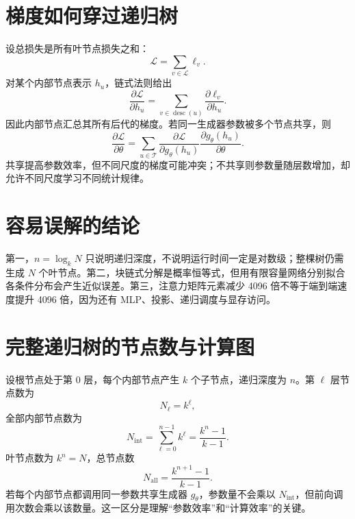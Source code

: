 \documentclass[UTF8,12pt,a4paper,fontset=none]{ctexart}
\numberwithin{equation}{section}
\newcommand{\Loss}{\mathcal{L}}
\begin{document}
\section{梯度如何穿过递归树}
设总损失是所有叶节点损失之和：
\begin{equation}
 \Loss=\sum_{v\in\mathcal{L}}\ell_v.
\end{equation}
对某个内部节点表示 $h_u$，链式法则给出
\begin{equation}
 \frac{\partial\Loss}{\partial h_u}
 =\sum_{v\in\operatorname{desc}(u)}
 \frac{\partial\ell_v}{\partial h_u}.
\end{equation}
因此内部节点汇总其所有后代的梯度。若同一生成器参数被多个节点共享，则
\begin{equation}
 \frac{\partial\Loss}{\partial\theta}
 =\sum_{u\in\mathcal{T}}
 \frac{\partial\Loss}{\partial g_\theta(h_u)}
 \frac{\partial g_\theta(h_u)}{\partial\theta}.
\end{equation}
共享提高参数效率，但不同尺度的梯度可能冲突；不共享则参数量随层数增加，却允许不同尺度学习不同统计规律。

\section{容易误解的结论}
\begin{criticalbox}[三点边界]
第一，$n=\log_kN$ 只说明递归深度，不说明运行时间一定是对数级；整棵树仍需生成 $N$ 个叶节点。第二，块链式分解是概率恒等式，但用有限容量网络分别拟合各条件分布会产生近似误差。第三，注意力矩阵元素减少 4096 倍不等于端到端速度提升 4096 倍，因为还有 MLP、投影、递归调度与显存访问。
\end{criticalbox}

\section{完整递归树的节点数与计算图}
设根节点处于第 $0$ 层，每个内部节点产生 $k$ 个子节点，递归深度为 $n$。第 $\ell$ 层节点数为
\begin{equation}
 N_\ell=k^\ell,
\end{equation}
全部内部节点数为
\begin{equation}
 N_{\mathrm{int}}=\sum_{\ell=0}^{n-1}k^\ell
 =\frac{k^n-1}{k-1}.
\end{equation}
叶节点数为 $k^n=N$，总节点数
\begin{equation}
 N_{\mathrm{all}}=\frac{k^{n+1}-1}{k-1}.
\end{equation}
若每个内部节点都调用同一参数共享生成器 $g_\theta$，参数量不会乘以 $N_{\mathrm{int}}$，但前向调用次数会乘以该数量。这一区分是理解“参数效率”和“计算效率”的关键。
\end{document}

